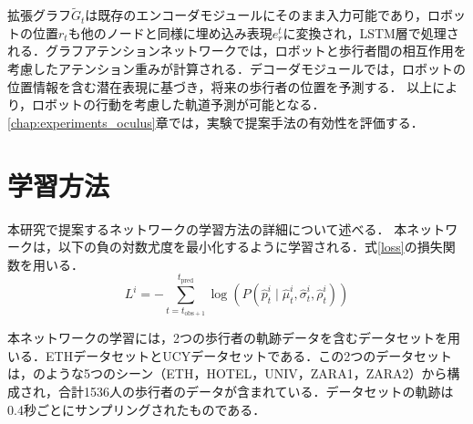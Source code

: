 拡張グラフ$\tilde{G}_t$は既存のエンコーダモジュールにそのまま入力可能であり，ロボットの位置$r_t$も他のノードと同様に埋め込み表現$e^t_r$に変換され，LSTM層で処理される．グラフアテンションネットワークでは，ロボットと歩行者間の相互作用を考慮したアテンション重みが計算される．デコーダモジュールでは，ロボットの位置情報を含む潜在表現に基づき，将来の歩行者の位置を予測する．
以上により，ロボットの行動を考慮した軌道予測が可能となる．\ref{chap:experiments_oculus}章では，実験で提案手法の有効性を評価する．

\vspace{-5pt}
\section{学習方法}\label{sec:learning-method}
本研究で提案するネットワークの学習方法の詳細について述べる．
本ネットワークは，以下の負の対数尤度を最小化するように学習される．式\eqref{loss}の損失関数を用いる．
\begin{equation}
  L^i = -\sum_{t=t_{\text{obs}+1}}^{t_{\text{pred}}} \log \left( P(\hat{p}^i_t \mid \hat{\mu}^i_t, \hat{\sigma}^i_t, \hat{\rho}^i_t) \right) \label{loss}
\end{equation}

本ネットワークの学習には，2つの歩行者の軌跡データを含むデータセットを用いる．ETHデータセット\cite{pellegrini2009you-eth}とUCYデータセット\cite{lerner2007crowds-ucy}である．この2つのデータセットは，のような5つのシーン（ETH，HOTEL，UNIV，ZARA1，ZARA2）から構成され，合計1536人の歩行者のデータが含まれている．データセットの軌跡は0.4秒ごとにサンプリングされたものである．

